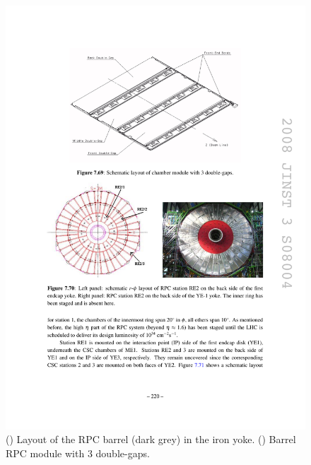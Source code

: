 \begin{figure}[hbtp]
\begin{center}
    \includegraphics[width=1.24\cmsFigWidth]{figures/cms-muon-RPCmodule3}
    \caption{(\cmsLeft) Layout of the RPC barrel (dark grey) in the iron yoke. (\cmsRight) Barrel RPC module with 3 double-gaps.~\cite{1748-0221-3-08-S08004}}
    \label{fig:cms-muon-RPCbarrel}
  \end{center}
\end{figure}

